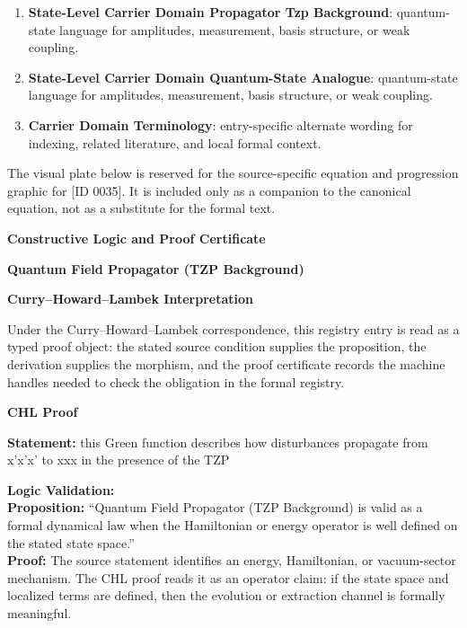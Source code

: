 \begingroup\footnotesize\sloppy
\begin{enumerate}[leftmargin=1.35em,itemsep=1pt,topsep=1pt,parsep=0pt]
\item \textbf{State-Level Carrier Domain Propagator Tzp Background}: quantum-state language for amplitudes, measurement, basis structure, or weak coupling.
\item \textbf{State-Level Carrier Domain Quantum-State Analogue}: quantum-state language for amplitudes, measurement, basis structure, or weak coupling.
\item \textbf{Carrier Domain Terminology}: entry-specific alternate wording for indexing, related literature, and local formal context.
\end{enumerate}
\endgroup

\begingroup\footnotesize\sloppy
The visual plate below is reserved for the source-specific equation and progression graphic for [ID 0035]. It is included only as a companion to the canonical equation, not as a substitute for the formal text.
\par\endgroup
\ifTZPDarkEdition
{}
\fi

\clearpage
\begingroup\tzpsupportsetup
\noindent\textbf{\fontsize{10.8pt}{12.8pt}\selectfont [ID 0035] Constructive Logic and Proof Certificate}\par
\noindent\textbf{\fontsize{10pt}{12pt}\selectfont Quantum Field Propagator (TZP Background)}\par
\vspace{0.45em}
\begingroup
\footnotesize
\setlength{\parskip}{0.22em}
\setlength{\parindent}{0pt}
\noindent\textbf{Curry--Howard--Lambek Interpretation}\par
Under the Curry--Howard--Lambek correspondence, this registry entry is read as a typed proof
object: the stated source condition supplies the proposition, the derivation supplies the
morphism, and the proof certificate records the machine handles needed to check the obligation
in the formal registry.

\vspace{0.45em}
\noindent\textbf{CHL Proof}\par
\textbf{Statement:} this Green function describes how disturbances propagate from x'x'x' to xxx in the
presence of the TZP

\textbf{Logic Validation:}\\
\textbf{Proposition:} ``Quantum Field Propagator (TZP Background) is valid as a formal dynamical law when the
Hamiltonian or energy operator is well defined on the stated state space.''\\
\textbf{Proof:} The source statement identifies an energy, Hamiltonian, or vacuum-sector mechanism. The
CHL proof reads it as an operator claim: if the state space and localized terms are
defined, then the evolution or extraction channel is formally meaningful.

